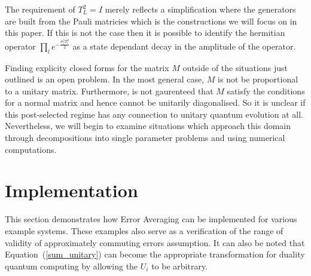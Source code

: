\documentclass[aps,pra,twocolumn,superscriptaddress,numerical,floatfix]{revtex4-1}
\begin{document}
The requirement of $T_L^2=I$ merely reflects a simplification where the generators are built from the Pauli matricies which is the constructions we will focus on in this paper.  If this is not the case then it is possible to identify the hermitian operator $\prod_l e^{-\frac{\sigma_l^2 T_l^2}{2}}$ as a state dependant decay in the amplitude of the operator.




Finding explicity closed forms for the matrix $M$ outside of the situations just outlined is an open problem.  In the most general case, $M$ is not be proportional to a unitary matrix.  Furthermore, is not gaurenteed that $M$ satisfy the conditions for a normal matrix and hence cannot be unitarily diagonalised.  So it is unclear if this post-selected regime has any connection to unitary quantum evolution at all.  Nevertheless, we will begin to examine situations which approach this domain through decompositions into single parameter problems and using numerical computations.

\section{Implementation\label{implementation}}

This section demonstrates how Error Averaging can be implemented for various example systems. These examples also serve as a verification of the range of validity of approximately commuting errors assumption. It can also be noted that Equation~(\ref{sum_unitary}) can become the appropriate transformation for duality quantum computing by allowing the $U_{i}$ to be arbitrary\cite{dualityQC}.
\end{document}
